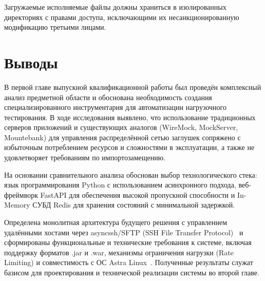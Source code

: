 
Загружаемые исполняемые файлы должны храниться в изолированных директориях с правами доступа, исключающими их несанкционированную модификацию третьими лицами.

\section {Выводы}

В первой главе выпускной квалификационной работы был проведён комплексный анализ предметной области и обоснована необходимость создания специализированного инструментария для автоматизации нагрузочного тестирования.
В ходе исследования выявлено, что использование традиционных серверов приложений и существующих аналогов (WireMock, MockServer, Mountebank) для управления распределённой сетью заглушек сопряжено с избыточным потреблением ресурсов и сложностями в эксплуатации, а также не удовлетворяет требованиям по импортозамещению.

На основании сравнительного анализа обоснован выбор технологического стека: язык программирования Python с использованием асинхронного подхода, веб-фреймворк FastAPI для обеспечения высокой пропускной способности и In-Memory СУБД Redis для хранения состояний с минимальной задержкой.

Определена монолитная архитектура будущего решения с управлением удалёнными хостами через asyncssh/SFTP (SSH File Transfer Protocol)~\cite{fowler-eaa} и сформированы функциональные и технические требования к системе, включая поддержку форматов .jar и .war, механизмы ограничения нагрузки (Rate Limiting) и совместимость с ОС Astra Linux~\cite{gost-59793-2021}. Полученные результаты служат базисом для проектирования и технической реализации системы во второй главе.
